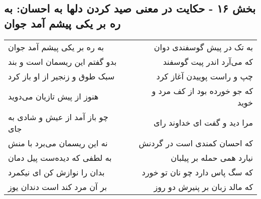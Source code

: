 \begin{center}
\section*{بخش ۱۶ - حکایت در معنی صید کردن دلها به احسان: به ره بر یکی پیشم آمد جوان}
\label{sec:016}
\begin{longtable}{l p{0.5cm} r}
به ره بر یکی پیشم آمد جوان
&&
به تک در پیش گوسفندی دوان
\\
بدو گفتم این ریسمان است و بند
&&
که می‌آرد اندر پیت گوسفند
\\
سبک طوق و زنجیر از او باز کرد
&&
چپ و راست پوییدن آغاز کرد
\\
هنوز از پیش تازیان می‌دوید
&&
که جو خورده بود از کف مرد و خوید
\\
چو باز آمد از عیش و شادی به جای
&&
مرا دید و گفت ای خداوند رای
\\
نه این ریسمان می‌برد با منش
&&
که احسان کمندی است در گردنش
\\
به لطفی که دیده‌ست پیل دمان
&&
نیارد همی حمله بر پیلبان
\\
بدان را نوازش کن ای نیکمرد
&&
که سگ پاس دارد چو نان تو خورد
\\
بر آن مرد کند است دندان یوز
&&
که مالد زبان بر پنیرش دو روز
\\
\end{longtable}
\end{center}
